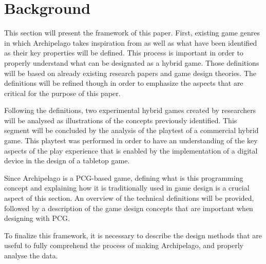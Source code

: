 \section{Background}
This section will present the framework of this paper. First, existing game genres in which Archipelago takes inspiration from as well as what have been identified as their key properties will be defined. This process is important in order to properly understand what can be designated as a hybrid game. Those definitions will be based on already existing research papers and game design theories. The definitions will be refined though in order to emphasize the aspects that are critical for the purpose of this paper.

Following the definitions, two experimental hybrid games created by researchers will be analysed as illustrations of the concepts previously identified. This segment will be concluded by the analysis of the playtest of a commercial hybrid game. This playtest was performed in order to have an understanding of the key aspects of the play experience that is enabled by the implementation of a digital device in the design of a tabletop game.

Since Archipelago is a PCG-based game, defining what is this programming concept and explaining how it is traditionally used in game design is a crucial aspect of this section. An overview of the technical definitions will be provided, followed by a description of the game design concepts that are important when designing with PCG. 

To finalize this framework, it is necessary to describe the design methods that are useful to fully comprehend the process of making Archipelago, and properly analyse the data. 


